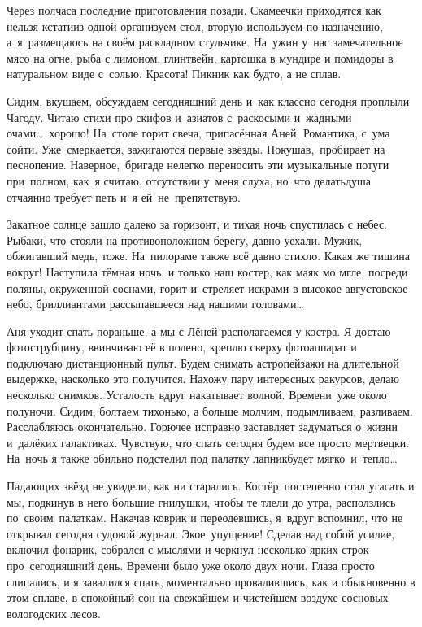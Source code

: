 Через полчаса последние приготовления позади. Скамеечки приходятся как нельзя кстати\mdash из одной организуем стол, вторую используем по назначению, а~я~размещаюсь на своём раскладном стульчике. На~ужин у~нас замечательное мясо на огне, рыба с лимоном, глинтвейн, картошка в мундире и помидоры в натуральном виде с~солью. Красота! Пикник как будто, а не сплав. 

Сидим, вкушаем, обсуждаем сегодняшний день и~как классно сегодня проплыли Чагоду. Читаю стихи про скифов и~азиатов с~раскосыми и~жадными очами\ldots~хорошо! На~столе горит свеча, припасённая Аней. Романтика, с~ума сойти. Уже~смеркается, зажигаются первые звёзды. Покушав,~пробирает на песнопение. Наверное,~бригаде нелегко переносить эти музыкальные потуги при~полном, как~я считаю, отсутствии у~меня слуха, но~что делать\mdash душа отчаянно требует петь и~я ей~не~препятствую. 

Закатное солнце зашло далеко за горизонт, и тихая ночь спустилась с небес. Рыбаки, что стояли на противоположном берегу, давно уехали. Мужик, обжигавший медь, тоже. На~пилораме также всё давно стихло. Какая же тишина вокруг! Наступила тёмная ночь, и только наш костер, как маяк мо мгле, посреди поляны, окруженной соснами, горит и~стреляет искрами в высокое августовское небо, бриллиантами рассыпавшееся над нашими головами\ldots~

Аня уходит спать пораньше, а мы с Лёней располагаемся у костра. Я достаю фотострубцину, ввинчиваю её в полено, креплю сверху фотоаппарат и подключаю дистанционный пульт. Будем снимать астропейзажи на длительной выдержке, насколько это получится. Нахожу пару интересных ракурсов, делаю несколько снимков. Усталость вдруг накатывает волной. Времени~уже около полуночи. Сидим, болтаем тихонько, а больше молчим, подымливаем, разливаем. Расслабляюсь окончательно. Горючее исправно заставляет задуматься о~жизни и~далёких галактиках. Чувствую, что спать сегодня будем все просто мертвецки. На~ночь я также обильно подстелил под палатку лапник\mdash будет мягко~и~тепло\ldots~
  
Падающих звёзд не увидели, как ни старались. Костёр~постепенно стал угасать и мы, подкинув в него большие гнилушки, чтобы те тлели до утра, расползлись по~своим~палаткам. Накачав коврик и переодевшись, я~вдруг вспомнил, что не открывал сегодня судовой журнал. Экое~упущение! Сделав над собой усилие, включил фонарик, собрался с мыслями и черкнул несколько ярких строк про~сегодняшний день. Времени было уже около двух ночи. Глаза просто слипались, и я завалился спать, моментально провалившись, как и обыкновенно в этом сплаве, в спокойный сон на свежайшем и чистейшем воздухе сосновых вологодских лесов.

\begin{center}
\end{center}